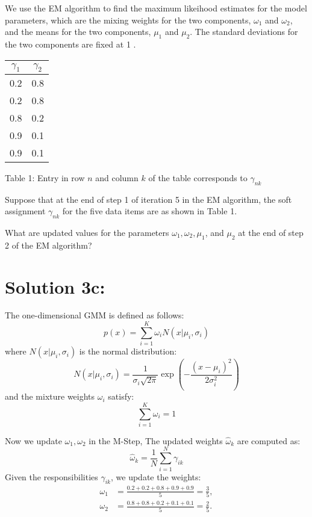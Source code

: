 \documentclass[10pt]{article}
\begin{document}
We use the EM algorithm to find the maximum likeihood estimates for the model parameters, which are the mixing weights for the two components, $\omega_{1}$ and $\omega_{2}$, and the means for the two components, $\mu_{1}$ and $\mu_{2}$. The standard deviations for the two components are fixed at 1 .

\begin{center}
\begin{tabular}{|c|c|}
\hline
$\gamma_{1}$ & $\gamma_{2}$ \\
\hline
0.2 & 0.8 \\
0.2 & 0.8 \\
0.8 & 0.2 \\
0.9 & 0.1 \\
0.9 & 0.1 \\
\hline
\end{tabular}
\end{center}

Table 1: Entry in row $n$ and column $k$ of the table corresponds to $\gamma_{n k}$

Suppose that at the end of step 1 of iteration 5 in the EM algorithm, the soft assignment $\gamma_{n k}$ for the five data items are as shown in Table 1.

What are updated values for the parameters $\omega_{1}, \omega_{2}, \mu_{1}$, and $\mu_{2}$ at the end of step 2 of the EM algorithm?


\section*{Solution 3c:}

The one-dimensional GMM is defined as follows: \\
\begin{equation}
    p(x) = \sum_{i=1}^{K} \omega_i N(x | \mu_i, \sigma_i)
\end{equation}
where \(N(x | \mu_i, \sigma_i)\) is the normal distribution: \\
\begin{equation}
    N(x | \mu_i, \sigma_i) = \frac{1}{\sigma_i \sqrt{2\pi}} \exp\left( -\frac{(x - \mu_i)^2}{2\sigma_i^2} \right)
\end{equation}
and the mixture weights \(\omega_i\) satisfy: \\
\begin{equation}
    \sum_{i=1}^{K} \omega_i = 1
\end{equation}

Now we update \( \omega_1, \omega_2 \) in the M-Step, The updated weights \(\hat{\omega}_k\) are computed as: \\
\begin{equation}
    \hat{\omega}_k = \frac{1}{N} \sum_{i=1}^{N} \gamma_{ik}
\end{equation}
Given the responsibilities \(\gamma_{ik}\), we update the weights: \\
\begin{align*}
    \omega_1 &= \frac{0.2 + 0.2 + 0.8 + 0.9 + 0.9}{5} = \frac{3}{5}, \\
    \omega_2 &= \frac{0.8 + 0.8 + 0.2 + 0.1 + 0.1}{5} = \frac{2}{5}.
\end{align*}
\end{document}
